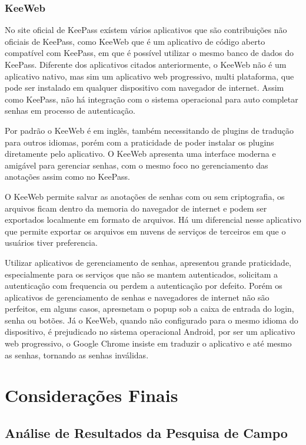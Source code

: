 \documentclass[12pt]{article}
\begin{document}
\subsubsection{KeeWeb}

No site oficial de KeePass exístem vários aplicativos que são contribuições não oficiais
de KeePass, como KeeWeb que é um aplicativo de código aberto compatível com KeePass, em
que é possível utilizar o mesmo banco de dados do KeePass.
Diferente dos aplicativos citados anteriormente, o KeeWeb não é um aplicativo
nativo, mas sim um aplicativo web progressivo, multi plataforma, que pode ser instalado
em qualquer dispositivo com navegador de internet.
Assim como KeePass, não há integração com o sistema operacional para auto completar senhas
em processo de autenticação.

Por padrão o KeeWeb é em inglês, também necessitando de plugins de tradução para outros
idiomas, porém com a praticidade de poder instalar os plugins diretamente pelo aplicativo.
O KeeWeb apresenta uma interface moderna e amigável para gerenciar senhas, com o mesmo foco
no gerenciamento das anotações assim como no KeePass.

O KeeWeb permite salvar as anotações de senhas com ou sem criptografia, os arquivos ficam
dentro da memoria do navegador de internet e podem ser exportados localmente em formato de
arquivos.
Há um diferencial nesse aplicativo que permite exportar os arquivos em nuvens de serviços
de terceiros em que o usuários tiver preferencia.

Utilizar aplicativos de gerenciamento de senhas, apresentou grande praticidade,
especialmente para os serviços que não se mantem autenticados, solicitam a
autenticação com frequencia ou perdem a autenticação por defeito.
Porém os aplicativos de gerenciamento de senhas e navegadores de internet não
são perfeitos, em alguns casos, apresnetam o popup sob a caixa de entrada do
login, senha ou botões.
Já o KeeWeb, quando não configurado para o mesmo idioma do dispositivo, é
prejudicado no sistema operacional Android, por ser um aplicativo web progressivo,
o Google Chrome insiste em traduzir o aplicativo e até mesmo as senhas, tornando
as senhas inválidas.

\section{Considerações Finais}

\subsection{Análise de Resultados da Pesquisa de Campo}
\end{document}
